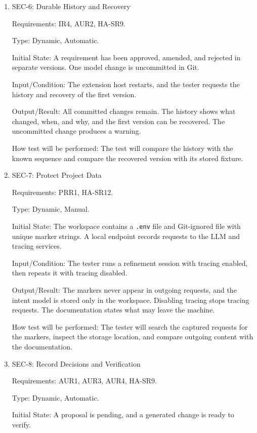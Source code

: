 \documentclass[12pt, titlepage]{article}
\begin{document}
\begin{enumerate}
\item{SEC-6: Durable History and Recovery\\}

Requirements: IR4, AUR2, HA-SR9.

Type: Dynamic, Automatic.

Initial State: A requirement has been approved, amended, and rejected in separate
versions. One model change is uncommitted in Git.

Input/Condition: The extension host restarts, and the tester requests the history
and recovery of the first version.

Output/Result: All committed changes remain. The history shows what changed, when,
and why, and the first version can be recovered. The uncommitted change produces a
warning.

How test will be performed: The test will compare the history with the known
sequence and compare the recovered version with its stored fixture.

\item{SEC-7: Protect Project Data\\}

Requirements: PRR1, HA-SR12.

Type: Dynamic, Manual.

Initial State: The workspace contains a \texttt{.env} file and Git-ignored file with
unique marker strings. A local endpoint records requests to the LLM and tracing
services.

Input/Condition: The tester runs a refinement session with tracing enabled, then
repeats it with tracing disabled.

Output/Result: The markers never appear in outgoing requests, and the intent model
is stored only in the workspace. Disabling tracing stops tracing requests. The
documentation states what may leave the machine.

How test will be performed: The tester will search the captured requests for the
markers, inspect the storage location, and compare outgoing content with the
documentation.

\item{SEC-8: Record Decisions and Verification\\}

Requirements: AUR1, AUR3, AUR4, HA-SR9.

Type: Dynamic, Automatic.

Initial State: A proposal is pending, and a generated change is ready to verify.


\end{enumerate}
\end{document}
